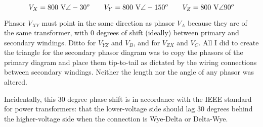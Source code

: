 $$V_X = 800 \hbox{ V} \angle -30^o \hskip 20pt V_Y = 800 \hbox{ V} \angle -150^o \hskip 20pt V_Z = 800 \hbox{ V} \angle 90^o$$







Phasor $V_{XY}$ must point in the same direction as phasor $V_A$ because they are of the same transformer, with 0 degrees of shift (ideally) between primary and secondary windings.  Ditto for $V_{YZ}$ and $V_B$, and for $V_{ZX}$ and $V_C$.  All I did to create the triangle for the secondary phasor diagram was to copy the phasors of the primary diagram and place them tip-to-tail as dictated by the wiring connections between secondary windings.  Neither the length nor the angle of any phasor was altered.

\vskip 10pt

Incidentally, this 30 degree phase shift is in accordance with the IEEE standard for power transformers: that the lower-voltage side should lag 30 degrees behind the higher-voltage side when the connection is Wye-Delta or Delta-Wye.




